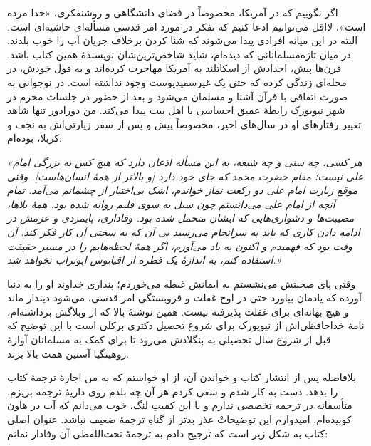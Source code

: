  {
	اگر نگوییم که در آمریکا، مخصوصاً در فضای دانشگاهی و روشنفکری، «خدا مرده است»، لااقل می‌توانیم ادعا کنیم که تفکر در مورد امر قدسی مسأله‌ای حاشیه‌ای است. البته در این میانه افرادی پیدا می‌شوند که شنا کردن برخلاف جریان آب را خوب بلدند. در میان تازه‌مسلمانانی که دیده‌ام، شاید شاخص‌ترین‌شان نویسندهٔ همین کتاب باشد.  قرن‌ها پیش، اجدادش از اسکاتلند به آمریکا مهاجرت کرده‌اند و به قول خودش، در محله‌ای زندگی کرده که حتی یک غیرسفید‌پوست وجود نداشته است. در نوجوانی به صورت اتفاقی با قرآن آشنا و مسلمان می‌شود و بعد از حضور در جلسات محرم در شهر نیویورک رابطهٔ عمیق احساسی با اهل بیت {} پیدا می‌کند. من دورادور تنها شاهد تغییر رفتارهای او در سال‌های اخیر، مخصوصاً پیش و پس از سفر زیارتی‌اش به نجف و کربلا، بوده‌ام:

\textit{
	«هر کسی، چه سنی و چه شیعه، به این مسأله اذعان دارد که هیچ کس به بزرگی امام علی{} نیست؛ مقام حضرت محمد{} که جای خود دارد [و بالاتر از همهٔ انسان‌هاست]. وقتی موقع زیارت امام علی{} دو رکعت نماز خواندم، اشک بی‌اختیار از چشمانم می‌آمد.  تمام آنچه از امام علی{} می‌دانستم چون سیل به سوی قلبم روانه شده بود. همهٔ بلاها، مصیبت‌ها و دشواری‌هایی که ایشان متحمل شده بود. وفاداری، پایمردی و عزمش در ادامه دادن کاری که باید به سرانجام می‌رسید بی آن که به سختی آن کار فکر کند. آن وقت بود که فهمیدم و اکنون به یاد می‌آورم، اگر همهٔ لحظه‌هایم را در مسیر حقیقت استفاده کنم، به اندازهٔ یک قطره از اقیانوس ابوتراب{} نخواهد شد.»}
	
	وقتی پای صحبتش می‌نشستم به ایمانش غبطه می‌خوردم؛ پنداری خداوند او را به دنیا آورده که یادمان بیاورد حتی در اوج غفلت و فروبستگی امر قدسی، می‌شود دیندار ماند و هیچ بهانه‌ای برای غفلت پذیرفته نیست. همین نوشتهٔ بالا که از وبلاگش برداشته‌ام، نامهٔ خداحافظی‌اش از نیویورک برای شروع تحصیل دکتری برکلی است با این توضیح که قبل از شروع سال تحصیلی به بنگلادش می‌رود تا برای کمک به مسلمانان آوارهٔ روهینگیا آستین همت  بالا بزند.
	
	بلافاصله پس از انتشار کتاب و خواندن آن، از او خواستم که به من اجازهٔ ترجمهٔ کتاب را بدهد. دست به کار شدم و سعی کردم هر آن چه بلدم روی داریهٔ ترجمه بریزم. متأسفانه  در ترجمه تخصصی ندارم و با این کمیتِ لنگ، خوب می‌دانم که آب در هاون کوبیده‌ام. امیدوارم این توضیحاتْ عذر بدتر از گناهِ ترجمهٔ ضعیف نباشد. عنوان اصلی کتاب به شکل زیر است که ترجیح دادم به ترجمهٔ تحت‌اللفظی آن وفادار نمانم:
	\begin{center}
{\small		{} }
	\end{center}
	
}
